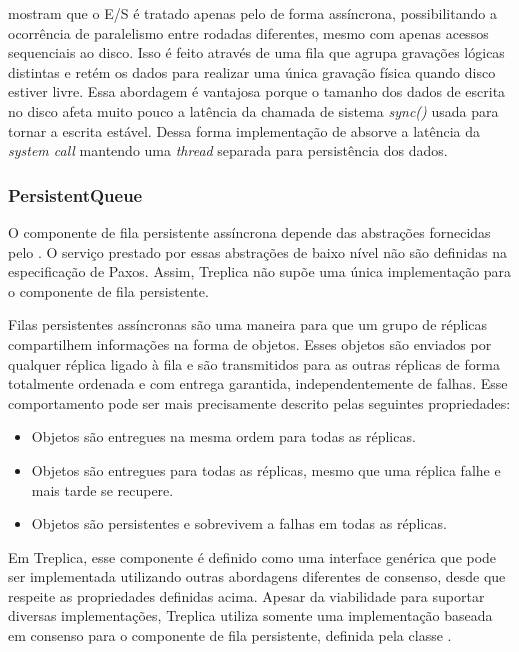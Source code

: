  mostram que o E/S é tratado apenas pelo  de
forma assíncrona, possibilitando a ocorrência de paralelismo entre rodadas diferentes,
mesmo com apenas acessos sequenciais ao disco. Isso é feito através de uma fila que agrupa
gravações lógicas distintas e retém os dados para realizar uma única gravação física
quando disco estiver livre. Essa abordagem é vantajosa porque o tamanho dos dados de
escrita no disco afeta muito pouco a latência da chamada de sistema \emph{sync()} usada
para tornar a escrita estável. Dessa forma implementação de  absorve
a latência da \emph{system call} mantendo uma \emph{thread} separada para persistência dos
dados.

\subsubsection{PersistentQueue}

O componente de fila persistente assíncrona depende das abstrações fornecidas pelo
. O serviço prestado por essas abstrações de baixo nível não são
definidas na especificação de Paxos. Assim, Treplica não supõe uma única implementação
para o componente de fila persistente.

Filas persistentes assíncronas são uma maneira para que um grupo de réplicas compartilhem
informações na forma de objetos. Esses objetos são enviados por qualquer réplica ligado à
fila e são transmitidos para as outras réplicas de forma totalmente ordenada e com entrega
garantida, independentemente de falhas. Esse comportamento pode ser mais precisamente
descrito pelas seguintes propriedades:

\begin{itemize}
  \item Objetos são entregues na mesma ordem para todas as réplicas.
  \item Objetos são entregues para todas as réplicas, mesmo que uma réplica falhe e mais
    tarde se recupere.
  \item Objetos são persistentes e sobrevivem a falhas em todas as réplicas.
\end{itemize}

Em Treplica, esse componente é definido como uma interface genérica que pode ser
implementada utilizando outras abordagens diferentes de consenso, desde que respeite as
propriedades definidas acima. Apesar da viabilidade para suportar diversas implementações,
Treplica utiliza somente uma implementação baseada em consenso para o componente de fila
persistente, definida pela classe .

